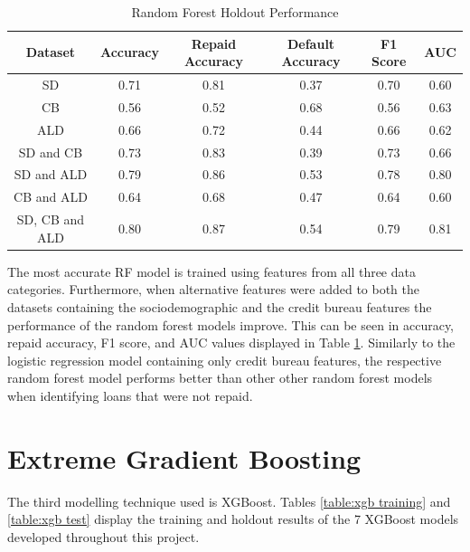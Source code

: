 \begin{table}[H]
\begin{center}
\begin{tabular}{|c|c|c|c|c|c|} 
\hline
\multicolumn{1}{|c|}{Dataset}
&\multicolumn{1}{|c|}{Accuracy}
&\multicolumn{1}{|c|}{Repaid Accuracy}
&\multicolumn{1}{|c|}{Default Accuracy}
&\multicolumn{1}{|c|}{F1 Score}
&\multicolumn{1}{|c|}{AUC}\\
\hline
SD & 0.71 & 0.81 & 0.37 & 0.70 & 0.60    \\
\hline
CB & 0.56 & 0.52 & 0.68 & 0.56 & 0.63    \\
\hline
ALD & 0.66 & 0.72 & 0.44 & 0.66 & 0.62    \\
\hline
SD and CB & 0.73 & 0.83 & 0.39 & 0.73 & 0.66    \\
\hline
SD and ALD & 0.79 & 0.86 & 0.53 & 0.78 & 0.80    \\
\hline
CB and ALD & 0.64 & 0.68 & 0.47 & 0.64 & 0.60    \\
\hline
SD, CB and ALD & 0.80 & 0.87 & 0.54 & 0.79 & 0.81    \\
\hline
\end{tabular}
\end{center}
\caption{Random Forest Holdout Performance}
\label{table:rf test}
\end{table}

\vspace{10pt}


The most accurate RF model is trained using features from all three data categories. Furthermore, when alternative features were added to both the datasets containing the sociodemographic and the credit bureau features the performance of the random forest models improve. This can be seen in accuracy, repaid accuracy, F1 score, and AUC values displayed in Table \ref{table:rf test}. Similarly to the logistic regression model containing only credit bureau features, the respective random forest model performs better than other other random forest models when identifying loans that were not repaid.  




\section{Extreme Gradient Boosting}

The third modelling technique used is XGBoost. Tables \ref{table:xgb training} and \ref{table:xgb test} display the training and holdout results of the 7 XGBoost models developed throughout this project. \\

